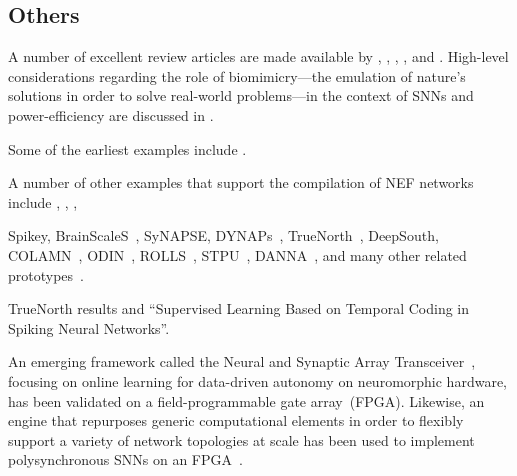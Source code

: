 \subsection{Others}
\label{sec:neuromorphic-others}

A number of excellent review articles are made available by \citet{bartolozzi1999neuromorphic}, \citet{indiveri2011neuromorphic}, \citet{cassidy2013design}, \citet{eryilmaz2016neuromorphic}, \citet{cummings2018} and \citet{rajendran2019low}.
High-level considerations regarding the role of biomimicry---the emulation of nature's solutions in order to solve real-world problems---in the context of SNNs and power-efficiency are discussed in \citet{krichmar2018making}.

Some of the earliest examples include \citet{sivilotti1985novel, mead1988silicon, boahen1989heteroassociative, mahowald1991silicon}.

A number of other examples that support the compilation of NEF networks include \citet{corradi2014}, \citet{wang2014compact, wang2017neuromorphic}, \citet{berzish2016}, \citet{fischl2018}

Spikey,
BrainScaleS~\citep{schemmel2010wafer, aamir2018mixed, aamir2018accelerated},
SyNAPSE,
DYNAPs~\citep{moradi2018scalable},
TrueNorth~\citep{merolla2014million, esser2016convolutional},
DeepSouth,
COLAMN~\citep{wijekoon2012vlsi},
ODIN~\citep{frenkel2018},
ROLLS~\citep{qiao2015reconfigurable, glatz2018adaptive},
STPU~\citep{smith2017novel},
DANNA~\citep{daffron2016extensions, mitchell2018danna},
and many other related prototypes~\citep[e.g.,][]{glackin2009hardware, binas2016precise, kim2018efficient, chen20184096, zheng2018low, larras2018fully}.

TrueNorth results \citep{} and ``Supervised Learning Based on Temporal Coding in Spiking Neural Networks''.

An emerging framework called the Neural and Synaptic Array Transceiver~\citep[NSAT;][]{detorakis2018neural}, focusing on online learning for data-driven autonomy on neuromorphic hardware, has been validated on a field-programmable gate array~(FPGA).
Likewise, an engine that repurposes generic computational elements in order to flexibly support a variety of network topologies at scale has been used to implement polysynchronous SNNs on an FPGA~\citep{wang2013neuromorphic, wang2018breaking}.

